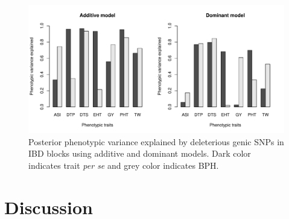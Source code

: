 \documentclass[9pt,twocolumn,twoside]{gsajnl}
\newcommand{\yang}[1]{\textcolor{cyan}{\emph{\bf  #1}} }
\begin{document}
\begin{figure}[htbp]
\centering
\includegraphics[width=\linewidth]{Figure_h2.pdf}
\caption{Posterior phenotypic variance explained by deleterious genic SNPs in IBD blocks using additive and dominant models. Dark color indicates trait \emph{per se} and grey color indicates BPH. }  
\label{fig:h2}
\end{figure}


\section*{Discussion}

\end{document}
